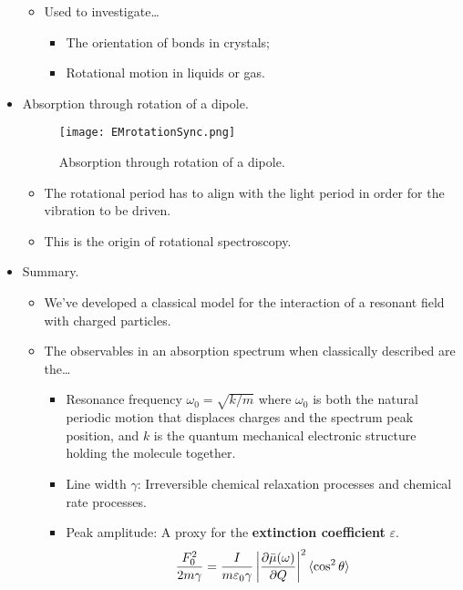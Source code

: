 \documentclass[../notes.tex]{subfiles}
\begin{document}
\begin{itemize}
\begin{itemize}
        \item Used to investigate\dots
        \begin{itemize}
            \item The orientation of bonds in crystals;
            \item Rotational motion in liquids or gas.
        \end{itemize}
    \end{itemize}
    \item Absorption through rotation of a dipole.
    \begin{figure}[h!]
        \centering
        \texttt{[image: EMrotationSync.png]}
        \caption{Absorption through rotation of a dipole.}
        \label{fig:EMrotationSync}
    \end{figure}
    \begin{itemize}
        \item The rotational period has to align with the light period in order for the vibration to be driven.
        \item This is the origin of rotational spectroscopy.
    \end{itemize}
    \item Summary.
    \begin{itemize}
        \item We've developed a classical model for the interaction of a resonant field with charged particles.
        \item The observables in an absorption spectrum when classically described are the\dots
        \begin{itemize}
            \item Resonance frequency $\omega_0=\sqrt{k/m}$ where $\omega_0$ is both the natural periodic motion that displaces charges and the spectrum peak position, and $k$ is the quantum mechanical electronic structure holding the molecule together.
            \item Line width $\gamma$: Irreversible chemical relaxation processes and chemical rate processes.
            \item Peak amplitude: A proxy for the \textbf{extinction coefficient} $\varepsilon$.
            \begin{equation*}
                \frac{F_0^2}{2m\gamma} = \frac{I}{m\varepsilon_0\gamma}\left| \pdv{\bar{\mu}(\omega)}{Q} \right|^2\langle \cos^2\theta \rangle
            \end{equation*}
        \end{itemize}
    \end{itemize}
\end{itemize}
\end{document}
